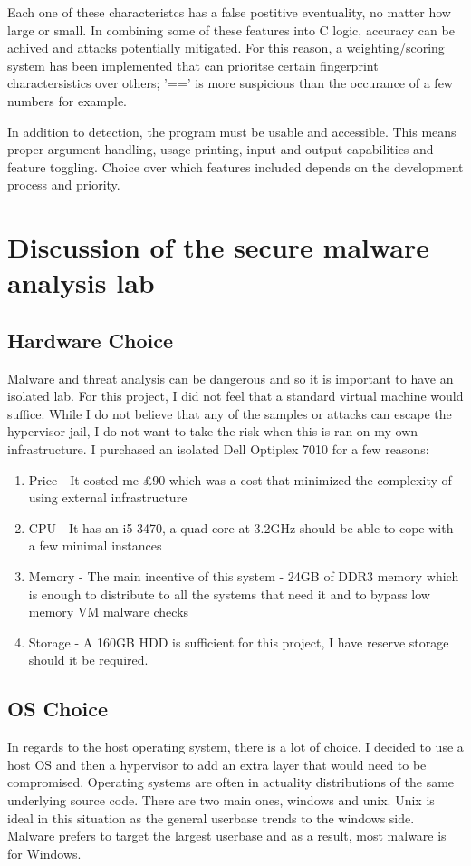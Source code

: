 Each one of these characteristcs has a false postitive eventuality, no matter how large or small. In combining some of these features into C logic, accuracy can be achived and attacks potentially mitigated. For this reason, a weighting/scoring system has been implemented that can prioritse certain fingerprint charactersistics over others; '==' is more suspicious than the occurance of a few numbers for example.

In addition to detection, the program must be usable and accessible. This means proper argument handling, usage printing, input and output capabilities and feature toggling. Choice over which features included depends on the development process and priority.


\chapter{Discussion of the secure malware analysis lab}
\section{Hardware Choice}
Malware and threat analysis can be dangerous and so it is important to have an isolated lab. For this project, I did not feel that a standard virtual machine would suffice. While I do not believe that any of the samples or attacks can escape the hypervisor jail, I do not want to take the risk when this is ran on my own infrastructure. 
I purchased an isolated Dell Optiplex 7010 for a few reasons: 
\begin{enumerate}
    \item Price - It costed me £90 which was a cost that minimized the complexity of using external infrastructure
    \item CPU - It has an i5 3470, a quad core at 3.2GHz should be able to cope with a few minimal instances
    \item Memory - The main incentive of this system - 24GB of DDR3 memory which is enough to distribute to all the systems that need it and to bypass low memory VM malware checks
    \item Storage - A 160GB HDD is sufficient for this project, I have reserve storage should it be required.
\end{enumerate}

\section{OS Choice}
In regards to the host operating system, there is a lot of choice. I decided to use a host OS and then a hypervisor to add an extra layer that would need to be compromised. Operating systems are often in actuality distributions of the same underlying source code. There are two main ones, windows and unix. Unix is ideal in this situation as the general userbase trends to the windows side. Malware prefers to target the largest userbase and as a result, most malware is for Windows.

